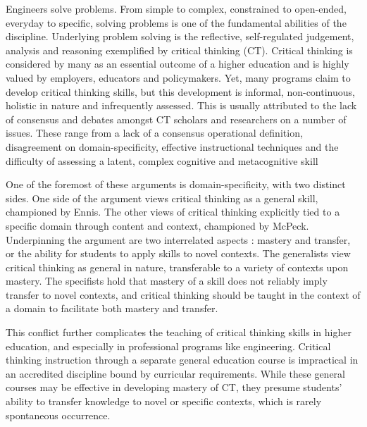 Engineers solve problems.  From simple to complex, constrained to open-ended, everyday to specific, solving problems is one of the fundamental abilities of the discipline.  Underlying problem solving is the reflective, self-regulated judgement, analysis and reasoning exemplified by critical thinking (CT).  Critical thinking is considered by many as an essential outcome of a higher education and is highly valued by employers, educators and policymakers.  Yet, many  programs claim to develop critical thinking skills, but this development is informal, non-continuous, holistic in nature and infrequently assessed\cite{Paul:1997ti, Ahern:2012ey}.  This is usually attributed to the lack of consensus and debates amongst CT scholars and researchers on a number of issues.  These range from a lack of a consensus operational definition, disagreement on domain-specificity\cite{Ennis:1989bm, McPeck:1990is}, effective instructional techniques\cite{Tsui:2002cc} and the difficulty of assessing a latent, complex cognitive and metacognitive skill\cite{Ennis:1993us, Halpern:2003tt}
 
One of the foremost of these arguments is domain-specificity, with two distinct sides.  One side of the argument views critical thinking as a general skill, championed by Ennis\cite{Ennis:1989bm}.  The other views of critical thinking explicitly tied to a specific domain through content and context, championed by McPeck\cite{McPeck:1990is}.  Underpinning the argument are two interrelated aspects : mastery and transfer, or the ability for students to apply skills to novel contexts. The generalists view critical thinking as general in nature, transferable to a variety of contexts upon mastery.  The specifists hold that mastery of a skill does not reliably imply transfer to novel contexts, and critical thinking should be taught in the context of a domain to facilitate both mastery and transfer.  

This conflict further complicates the teaching of critical thinking skills in higher education, and especially in professional programs like engineering.  Critical thinking instruction through a separate general education course is impractical in an accredited discipline bound by curricular requirements.  While these general courses may be effective in developing mastery of CT, they presume students’ ability to transfer knowledge to novel or specific contexts, which is rarely spontaneous occurrence\cite{Abrami:2008ew}.

